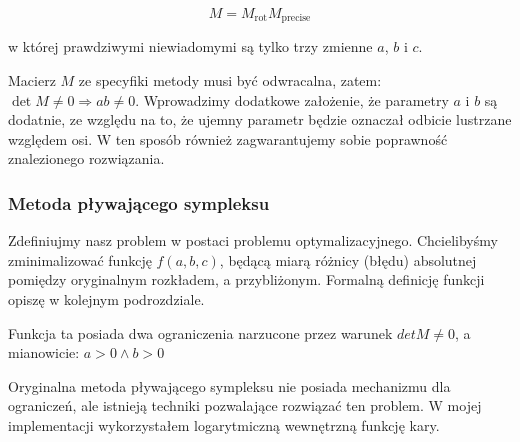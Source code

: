 \documentclass[../main.tex]{subfiles}
\begin{document}
$$
M = M_{\text{rot}} M_{\text{precise}}
$$

w której prawdziwymi niewiadomymi są tylko trzy zmienne $a$, $b$ i $c$.

Macierz $M$ ze specyfiki metody musi być odwracalna, zatem:
  $\det M \neq 0 \Rightarrow ab \neq 0$.
Wprowadzimy dodatkowe założenie, że parametry $a$ i $b$ są dodatnie, ze względu
na to, że ujemny parametr będzie oznaczał odbicie lustrzane względem osi.
W ten sposób również zagwarantujemy sobie poprawność znalezionego rozwiązania.

\subsubsection{Metoda pływającego sympleksu}

Zdefiniujmy nasz problem w postaci problemu optymalizacyjnego. Chcielibyśmy
zminimalizować funkcję $f(a,b,c)$, będącą miarą różnicy (błędu) absolutnej
pomiędzy oryginalnym rozkładem, a przybliżonym. Formalną definicję funkcji
opiszę w kolejnym podrozdziale.

Funkcja ta posiada dwa ograniczenia narzucone przez warunek $detM \neq 0$,
a mianowicie:
  $a > 0 \wedge b > 0$

Oryginalna metoda pływającego sympleksu nie posiada mechanizmu dla ograniczeń,
ale istnieją techniki pozwalające rozwiązać ten problem. W mojej implementacji
wykorzystałem logarytmiczną wewnętrzną funkcję kary.


\end{document}

